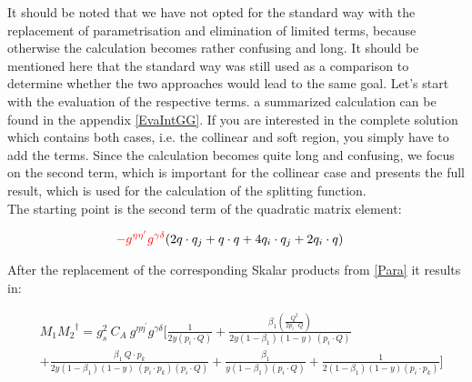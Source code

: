 It should be noted that we have not opted for the standard way with the replacement of parametrisation and elimination of limited terms, because otherwise the calculation becomes rather confusing and long. It should be mentioned here that the standard way was still used as a comparison to determine whether the two approaches would lead to the same goal. Let's start with the evaluation of the respective terms.
a summarized calculation can be found in the appendix \ref{EvaIntGG}. If you are interested in the complete solution which contains both cases, i.e. the collinear and soft region, you simply have to add the terms. Since the calculation becomes quite long and confusing, we focus on the second term, which is important for the collinear case and presents the full result, which is used for the calculation of the splitting function.\\
The starting point is the second term of the quadratic matrix element:

\begin{equation}
\begin{split}
&{\color[RGB]{255,0,0} -g^{{{\eta}}{{\eta}^{\prime}}}g^{{{\gamma}}{{\delta}}}}( 2q\cdot q_j+ q\cdot q+4q_i \cdot q_j+2q_i \cdot q)
\end{split}
\end{equation}

After the replacement of the corresponding Skalar products from \ref{Para} it results in:


\begin{equation}
\begin{split}
&M_1{M_2}^{\dagger}=g_s^2\: C_A\:g^{{{\eta}}{{\eta}^{\prime}}}g^{{{\gamma}}{{\delta}}}[\frac{1}{2y(p_i \cdot Q)}+\frac{\beta_1(\frac{Q^2}{2p_i \cdot Q})}{2y(1-\beta_1) (1-y)\:(p_i \cdot Q)}\\
&+\frac{\beta_1\:Q\cdot p_k}{2y(1-\beta_1) (1-y)\:(p_i \cdot p_k)(p_i \cdot Q)}+\frac{\beta_1}{y(1-\beta_1) (p_i \cdot Q)}+\frac{1}{2(1-\beta_1)(1-y) (p_i \cdot p_k)}]\\
\end{split}
\end{equation}



